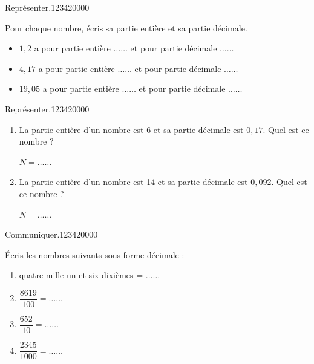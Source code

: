 \begin{pageAD} 


 
\begin{ExoCad}{Représenter.}{1234}{2}{0}{0}{0}{0}

Pour chaque nombre, écris sa partie entière et sa partie décimale.

\begin{itemize}
\item  $1,2$ a pour partie entière $\ldots \ldots $ et pour partie décimale $\ldots \ldots $ 
\item  $4,17$ a pour partie entière $\ldots \ldots $ et pour partie décimale $\ldots \ldots $ 
\item  $19,05$ a pour partie entière $\ldots \ldots $ et pour partie décimale $\ldots \ldots $ 
\end{itemize}
\end{ExoCad}

\begin{ExoCad}{Représenter.}{1234}{2}{0}{0}{0}{0}

\begin{enumerate}

\item  La partie entière d'un nombre est 6 et sa partie décimale est $0,17$. Quel est ce nombre ?

$N =  \ldots \ldots $ 


\item  La partie entière d'un nombre est 14 et sa partie décimale est $0,092$. Quel est ce nombre ?

$N = \ldots \ldots $ 
\end{enumerate}
\end{ExoCad}

\begin{minipage}{0.58\linewidth}



\begin{ExoCad}{Communiquer.}{1234}{2}{0}{0}{0}{0}

 Écris les nombres suivants sous forme décimale :
 \begin{enumerate}
 \item quatre-mille-un-et-six-dixièmes = $\ldots \ldots $ \vspace{0.2cm}
 \item $\dfrac{8619}{100}  =  \ldots \ldots $ \vspace{0.2cm}
 \item $\dfrac{652}{10}  =  \ldots \ldots $ \vspace{0.2cm}
 \item $\dfrac{2345}{1000}  =  \ldots \ldots $
 \end{enumerate}
 \end{ExoCad}



\end{minipage}
\end{pageAD}
